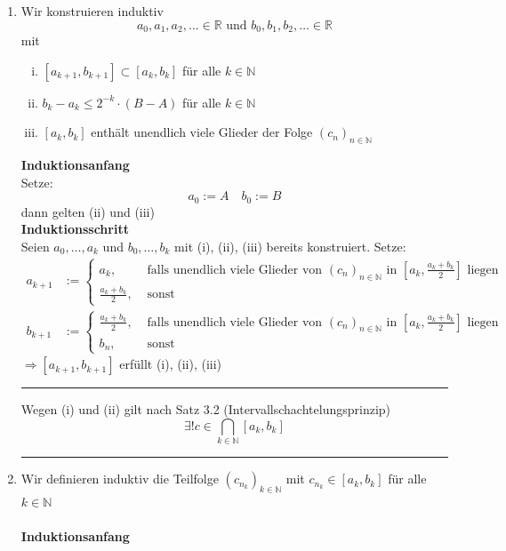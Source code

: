 \begin{enumerate}[1.]
	\item Wir konstruieren induktiv
	\[
		a_0, a_1, a_2, \ldots \in \mathds{R} \text{ und } b_0, b_1, b_2, \ldots \in \mathds{R}
	\]
	mit
	\begin{enumerate}[(i)]
		\item $[a_{k+1}, b_{k+1}] \subset [a_k, b_k]$ für alle $k \in \mathds{N}$
		\item $b_k -a_k \leq 2^{-k} \cdot (B-A)$ für alle $k \in \mathds{N}$
		\item $[a_k , b_k]$ enthält unendlich viele Glieder der Folge $(c_n)_{n \in \mathds{N}}$
	\end{enumerate}
	\textbf{Induktionsanfang} \\
	Setze:
	\[
		a_0 := A \quad b_0 := B
	\]
	dann gelten (ii) und (iii) 
	\vspace{\baselineskip} \\
	\textbf{Induktionsschritt} \\
	Seien $a_0, \ldots , a_k$ und $b_0 , \ldots , b_k$ mit (i), (ii), (iii) bereits konstruiert. Setze:
	\begin{align*}
		a_{k+1} &:= \begin{cases}
			a_k, &\text{ falls } \text{unendlich viele Glieder von } (c_n)_{n \in \mathds{N}} \text{ in }[a_k , \frac{a_k + b_k}{2}] \text{ liegen} \\
			\frac{a_k + b_k}{2} , &\text{ sonst } 
		\end{cases} \\
		b_{k+1} &:= \begin{cases}
			\frac{a_k + b_k}{2}, &\text{ falls } \text{unendlich viele Glieder von } 
			(c_n)_{n \in \mathds{N}} \text{ in }[a_k , \frac{a_k + b_k}{2}] \text{ liegen}\\
			b_n , &\text{ sonst } 
		\end{cases}
	\end{align*}
	$\Rightarrow [a_{k+1} , b_{k+1}]$ erfüllt (i), (ii), (iii) \\
	\hrule Wegen (i) und (ii) gilt nach Satz 3.2 (Intervallschachtelungsprinzip)
	\[
		\exists ! c \in \bigcap_{k \in \mathds{N}} [a_k ,b_k]
	\]
	\hrule 
	\item Wir definieren induktiv die Teilfolge $(c_{n_k})_{k \in \mathds{N}}$ mit $c_{n_k} \in [a_k, b_k]$ für alle $k \in \mathds{N}$ \\
	\vspace{\baselineskip} \\
	\textbf{Induktionsanfang} \\

\end{enumerate}
